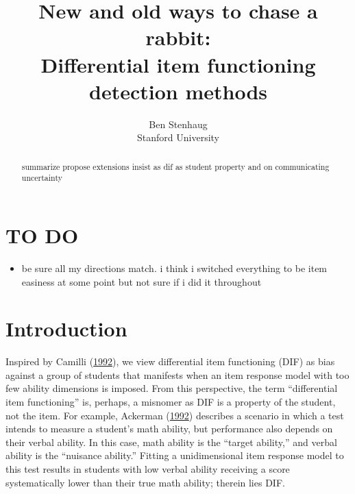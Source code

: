 \documentclass[
  11pt,
]{article}
\title{New and old ways to chase a rabbit:\\
Differential item functioning detection methods}
\subtitle{Ben Stenhaug\\
Stanford University}
\author{}
\date{\vspace{-2.5em}}
\providecommand{\tightlist}{%
  \setlength{\itemsep}{0pt}\setlength{\parskip}{0pt}}
\begin{document}
\maketitle
\begin{abstract}
summarize propose extensions insist as dif as student property and on communicating uncertainty
\end{abstract}

{
\setcounter{tocdepth}{5}
\tableofcontents
}
\clearpage

\hypertarget{to-do}{%
\section{TO DO}\label{to-do}}

\begin{itemize}
\tightlist
\item
  be sure all my directions match. i think i switched everything to be item easiness at some point but not sure if i did it throughout
\end{itemize}

\hypertarget{introduction}{%
\section{Introduction}\label{introduction}}

Inspired by Camilli (\protect\hyperlink{ref-camilli1992conceptual}{1992}), we view differential item functioning (DIF) as bias against a group of students that manifests when an item response model with too few ability dimensions is imposed. From this perspective, the term \enquote{differential item functioning} is, perhaps, a misnomer as DIF is a property of the student, not the item. For example, Ackerman (\protect\hyperlink{ref-ackerman1992didactic}{1992}) describes a scenario in which a test intends to measure a student's math ability, but performance also depends on their verbal ability. In this case, math ability is the \enquote{target ability,} and verbal ability is the \enquote{nuisance ability.} Fitting a unidimensional item response model to this test results in students with low verbal ability receiving a score systematically lower than their true math ability; therein lies DIF.
\end{document}
